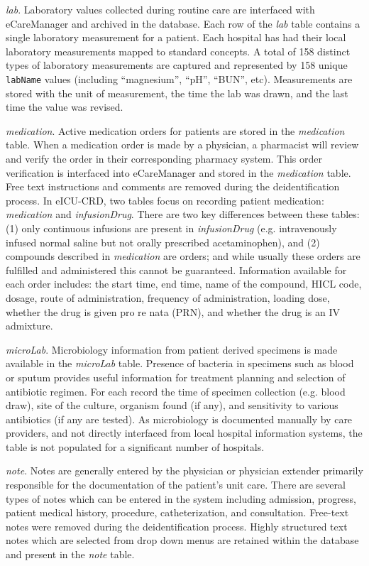 \documentclass[english]{article}
\newcommand{\colname}[1]{\texttt{#1}}
\newcommand{\tblname}[1]{\emph{#1}}
\begin{document}
\tblname{lab}. Laboratory values collected during routine care are interfaced with
eCareManager and archived in the database.
Each row of the \tblname{lab} table contains a single laboratory measurement for a patient.
Each hospital has had their local laboratory measurements mapped to standard concepts.
A total of 158 distinct types of laboratory measurements are captured and represented by 158 unique \colname{labName} values (including ``magnesium'', ``pH'', ``BUN'', etc).
Measurements are stored with the unit of measurement, the time the lab was drawn,
and the last time the value was revised.

\tblname{medication}. Active medication orders for patients are stored in the \tblname{medication} table.
When a medication order is made by a physician, a pharmacist will review and verify the order in their corresponding pharmacy system. This order verification is interfaced into eCareManager and stored in the \tblname{medication} table. Free text instructions and comments are removed during the deidentification process.
In eICU-CRD, two tables focus on recording patient medication: \tblname{medication} and \tblname{infusionDrug}.
There are two key differences between these tables: (1) only continuous infusions are present in \tblname{infusionDrug} (e.g. intravenously infused normal saline but not orally prescribed acetaminophen), and (2) compounds described in \tblname{medication} are orders; and while usually these orders are fulfilled and administered this cannot be guaranteed. Information available for each order includes: the start time, end time, name of the compound, HICL code, dosage, route of administration, frequency of administration, loading dose, whether the drug is given pro re nata (PRN), and whether the drug is an IV admixture.

\tblname{microLab}. Microbiology information from patient derived specimens is made available in the \tblname{microLab} table. Presence of bacteria in specimens such as blood or sputum provides useful information for treatment planning and selection of antibiotic regimen. For each record the time of specimen collection (e.g. blood draw), site of the culture, organism found (if any), and sensitivity to various antibiotics (if any are tested).
As microbiology is documented manually by care providers, and not directly interfaced from local hospital information systems, the table is not populated for a significant number of hospitals.

\tblname{note}. Notes are generally entered by the physician or physician extender primarily responsible for the documentation of the patient's unit care. There are several types of notes which can be entered in the system including admission, progress, patient medical history, procedure, catheterization, and consultation. Free-text notes were removed during the deidentification process. Highly structured text notes which are selected from drop down menus are retained within the database and present in the \tblname{note} table.
\end{document}

